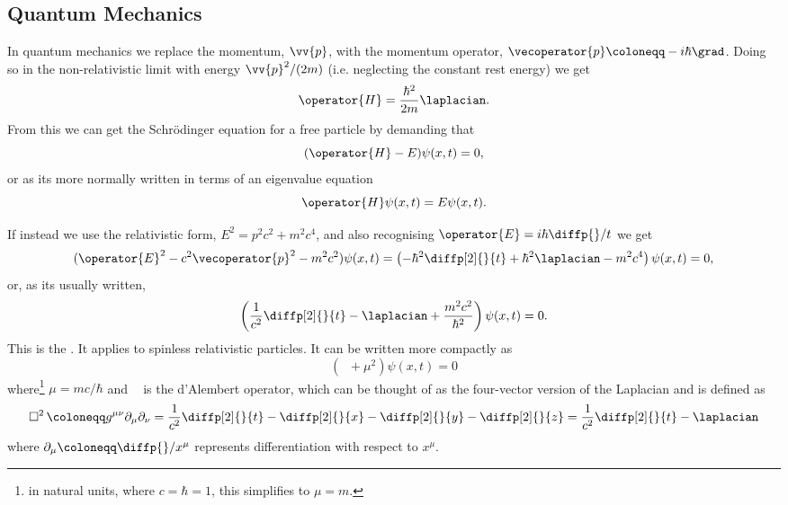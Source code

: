 \documentclass[fleqn]{NotesClass}
\newcommand*{\dAlembert}{\mathop{{}\Box^2}\nolimits}
\begin{document}
    \subsection{Quantum Mechanics}
    In quantum mechanics we replace the momentum, \(\vv{p}\), with the momentum operator, \(\vecoperator{p} \coloneqq -i\hbar\grad\).
    Doing so in the non-relativistic limit with energy \(\vv{p}^2/(2m)\) (i.e. neglecting the constant rest energy) we get
    \begin{equation}
        \operator{H} = \frac{\hbar^2}{2m}\laplacian.
    \end{equation}
    From this we can get the Schr\"odinger equation for a free particle by demanding that
    \begin{equation}
        (\operator{H} - E)\psi(x, t) = 0,
    \end{equation}
    or as its more normally written in terms of an eigenvalue equation
    \begin{equation}
        \operator{H} \psi(x, t) = E\psi(x, t).
    \end{equation}
    
    If instead we use the relativistic form, \(E^2 = p^2c^2 + m^2c^4\), and also recognising \(\operator{E} = i\hbar\diffp{}/{t}\) we get
    \begin{equation}
        (\operator{E}^2 - c^2\vecoperator{p}^2 - m^2c^2)\psi(x, t) = 
        \left( -\hbar^2\diffp[2]{}{t} + \hbar^2\laplacian - m^2c^4 \right)\psi(x, t) = 0,
    \end{equation}
    or, as its usually written,
    \begin{equation}
        \left( \frac{1}{c^2}\diffp[2]{}{t} - \laplacian + \frac{m^2c^2}{\hbar^2} \right)\psi(x, t) = 0.
    \end{equation}
    This is the .
    It applies to spinless relativistic particles.
    It can be written more compactly as
    \begin{equation}
        (\dAlembert + \mu^2)\psi(x, t) = 0
    \end{equation}
    where\footnote{in natural units, where \(c = \hbar = 1\), this simplifies to \(\mu = m\).} \(\mu = mc/\hbar\) and \(\dAlembert\) is the d'Alembert operator, which can be thought of as the four-vector version of the Laplacian and is defined as
    \begin{equation}
        \dAlembert \coloneqq g^{\mu\nu}\partial_\mu\partial_\nu = \frac{1}{c^2}\diffp[2]{}{t} - \diffp[2]{}{x} - \diffp[2]{}{y} - \diffp[2]{}{z} = \frac{1}{c^2}\diffp[2]{}{t} - \laplacian
    \end{equation}
    where \(\partial_\mu \coloneqq \diffp{}/{x^\mu}\) represents differentiation with respect to \(x^\mu\).
    
\end{document}

